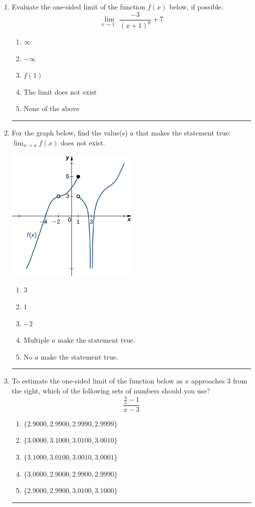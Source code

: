 \documentclass[14pt]{extbook}
\newcommand{\litem}[1]{\item#1\hspace*{-1cm}\rule{\textwidth}{0.4pt}}
\begin{document}
\begin{enumerate}
\litem{
Evaluate the one-sided limit of the function $f(x)$ below, if possible.\[ \lim_{x \rightarrow 1^-} \frac{-3}{(x+1)^8}+7 \]\begin{enumerate}[label=\Alph*.]
\item \( \infty \)
\item \( -\infty \)
\item \( f(1) \)
\item \( \text{The limit does not exist} \)
\item \( \text{None of the above} \)

\end{enumerate} }
\litem{
For the graph below, find the value(s) $a$ that makes the statement true: $ \displaystyle \lim_{x \rightarrow a} f(x)$ does not exist.
\begin{center}
    \includegraphics[width=0.5\textwidth]{../Figures/evaluateLimitGraphicallyB.png}
\end{center}
\begin{enumerate}[label=\Alph*.]
\item \( 3 \)
\item \( 1 \)
\item \( -2 \)
\item \( \text{Multiple } a \text{ make the statement true}. \)
\item \( \text{No } a \text{ make the statement true}. \)

\end{enumerate} }
\litem{
To estimate the one-sided limit of the function below as $x$ approaches 3 from the right, which of the following sets of numbers should you use?\[ \frac{\frac{3}{x} - 1}{x - 3} \]\begin{enumerate}[label=\Alph*.]
\item \( \{ 2.9000, 2.9900, 2.9990, 2.9999 \} \)
\item \( \{ 3.0000, 3.1000, 3.0100, 3.0010 \} \)
\item \( \{ 3.1000, 3.0100, 3.0010, 3.0001 \} \)
\item \( \{ 3.0000, 2.9000, 2.9900, 2.9990 \} \)
\item \( \{ 2.9000, 2.9900, 3.0100, 3.1000 \} \)


\end{enumerate}}
\end{enumerate}
\end{document}
